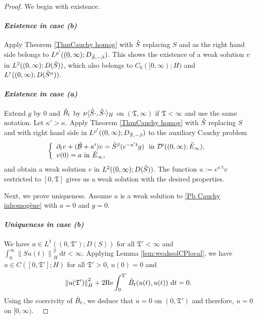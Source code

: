 \documentclass[11pt, letterpaper]{amsart}
\theoremstyle{definition}
\theoremstyle{remark}
\numberwithin{equation}{section}
\begin{document}
\begin{proof} We begin with existence.


\paragraph{\textit{Existence in case (b) }}  Apply Theorem \ref{ThmCauchy homog} with $\Tilde{S}$ replacing 
$S$ and as the right hand side belongs to $L^{\rho'}((0,\infty);D_{\Tilde{S},-\beta})$. This shows the existence of a weak solution $v$ in $L^2((0,\infty); D(\Tilde{S}))$, which also belongs to $C_0([0,\infty); H)$ and $L^r((0,\infty); D(\Tilde{S}^\alpha))$.


\paragraph{\textit{Existence in case (a) }}
Extend $g$ by $0$ and $\Tilde{B}_t$ by $\nu\langle \Tilde{S}\cdot, \Tilde{S}\cdot \rangle_H$ on $(\mathfrak{T}, \infty)$ if  $\mathfrak{T}<\infty$ and use the same notation. Let $\kappa'>\kappa$. Apply Theorem \ref{ThmCauchy homog} with $\Tilde{S}$ replacing $S$ and with right hand side in $L^{\rho'}((0,\infty);D_{\Tilde{S},-\beta})$ to the auxiliary Cauchy problem 
\begin{align*}
\left\{
    \begin{array}{ll}
        \partial_t v + (\Tilde{\mathcal{B}}+\kappa')v =
        \Tilde{S}^\beta  (e^{-\kappa' t} {g})  \ \ \mathrm{in} \ \mathcal{D}'((0,\infty); \Tilde{E}_\infty), \\
        v(0)=a \  \mathrm{in} \ \Tilde{E}_\infty,
    \end{array}
\right.
\end{align*}  and obtain a weak solution $v$ in $L^2((0,\infty); D(\Tilde{S}))$.
The function $u:=e^{\kappa' t} v$ restricted to $[0,\mathfrak{T}]$ gives us a weak solution with the desired properties. 


 
Next, we prove uniqueness. Assume $u$ is a weak solution to \eqref{Pb Cauchy inhomogène} with $a=0$ and $g=0$.
\paragraph{\textit{Uniqueness in case (b) }} We have $u \in L^1((0,\mathfrak{T}'); D(S))$ for all $\mathfrak{T'}<\infty$ and $\int_{0}^{\infty} \left\|Su(t) \right\|_H^2 \ \mathrm d t <\infty$. Applying Lemma \ref{lem:weaksolCPlocal}, we have $u \in C([0,\mathfrak{T}']; H)$ for all $\mathfrak{T'}>0$, $u(0)=0$ and
 \begin{equation*}
  \left \| u(\mathfrak{T}') \right \|^2_H +  2\mathrm{Re}\int_{0}^{\mathfrak{T}'}  \Tilde{B}_t(u(t),u(t))  \ \mathrm dt=  0.
 \end{equation*}
Using the coercivity of $\Tilde{B}_t $,  we deduce that $u=0$ on $(0,\mathfrak{T}')$ and therefore, $u=0$ on $[0,\infty)$.
\

\end{proof}
\end{document}
